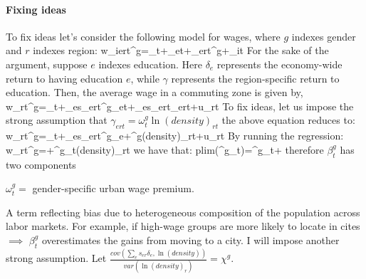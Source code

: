 \paragraph{Fixing ideas}
To fix ideas let's consider the following model for wages, where $g$ indexes gender and $r$ indexes region:
\beqns
	w_{iert}^g=\alpha_t+\delta_{et}+\gamma_{ert}^g+\varepsilon_{it}
\eeqns
For the sake of the argument, suppose $e$ indexes education. Here $\delta_e$ represents the economy-wide return to having education $e$, while $\gamma$ represents the region-specific return to education. Then, the average wage in a commuting zone is given by,
\beqns
		w_{rt}^g=\alpha_t+\sum_es_{ert}^g\delta_{et}+\sum_es_{ert}\gamma_{ert}+u_{rt}
\eeqns
To fix ideas, let us impose the strong assumption that $\gamma_{ert}=\omega^g_t\ln(density)_{rt}$ the above equation reduces to:
\beqns
	w_{rt}^g=\alpha_t+\sum_es_{ert}^g\delta_e+\omega^g\ln(density)_{rt}+u_{rt}
\eeqns
By running the regression:
\beqns
	w_{rt}^g=\alpha+\beta^g_t\ln(density)_{rt}
\eeqns
we have that:
\beqns
	plim(\beta^g_t)=\omega^g_t+
\eeqns
therefore $\beta^g_t$ has two components
\bitem
	\item $\omega^g_t=$ gender-specific urban wage premium.
	\item A term reflecting bias due to heterogeneous composition of the population across labor markets. For example, if high-wage groups are more likely to locate in cites $\implies$ $\beta^g_t$ overestimates the gains from moving to a city.
\eitem
I will impose another strong assumption. Let $\frac{cov(\sum_es_{er}\delta_e,\ln(density))}{var(\ln(density)_r)}=\chi^g$.

